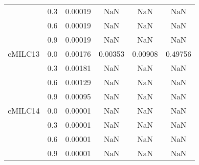 \begin{longtable}{cccccc}
        & 0.3 & 0.00019 & NaN & NaN & NaN \\
        & 0.6 & 0.00019 & NaN & NaN & NaN \\
        & 0.9 & 0.00019 & NaN & NaN & NaN \\
cMILC13 & 0.0 & 0.00176 & 0.00353 & 0.00908 & 0.49756 \\
        & 0.3 & 0.00181 & NaN & NaN & NaN \\
        & 0.6 & 0.00129 & NaN & NaN & NaN \\
        & 0.9 & 0.00095 & NaN & NaN & NaN \\
cMILC14 & 0.0 & 0.00001 & NaN & NaN & NaN \\
        & 0.3 & 0.00001 & NaN & NaN & NaN \\
        & 0.6 & 0.00001 & NaN & NaN & NaN \\
        & 0.9 & 0.00001 & NaN & NaN & NaN \\
\end{longtable}
